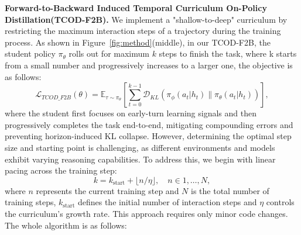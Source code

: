 \documentclass{article} %
\newcommand{\ours}{TCOD\xspace}
\newcommand{\oursfull}{Temporal Curriculum On-Policy Distillation\xspace}
\begin{document}
\textbf{Forward-to-Backward Induced \oursfull (\ours-F2B).}
We implement a "shallow-to-deep" curriculum by restricting the maximum interaction steps of a trajectory during the training process. 
As shown in Figure~\ref{fig:method}(middle), in our \ours-F2B, the student policy $\pi_\theta$ rolls out for maximum $k$ steps to finish the task, where k starts from a small number and progressively increases to a larger one, the objective is as follows:
\begin{equation}
\mathcal{L}_{TCOD\_F2B}(\theta) = \mathbb{E}_{\tau \sim \pi_\theta} \left[ \sum_{t=0}^{k-1} \mathcal{D}_{KL} \left( \pi_\phi(a_t|h_t) \parallel \pi_\theta(a_t|h_t) \right) \right],
\end{equation}
where the student first focuses on early-turn learning signals and then progressively completes the task end-to-end, mitigating compounding errors and preventing horizon-induced KL collapse.
However, determining the optimal step size and starting point is challenging, as different environments and models exhibit varying reasoning capabilities. 
To address this, we begin with linear pacing across the training step:
\begin{equation}
k = k_{\text{start}} + \lfloor n / \eta \rfloor, \quad n \in {1, \dots, N},
\label{eq:pacing}
\end{equation}
where $n$ represents the current training step and $N$ is the total number of training steps, $k_{\text{start}}$ defines the initial number of interaction steps and $\eta$ controls the curriculum’s growth rate. 
This approach requires only minor code changes. The whole algorithm is as follows:
\end{document}
